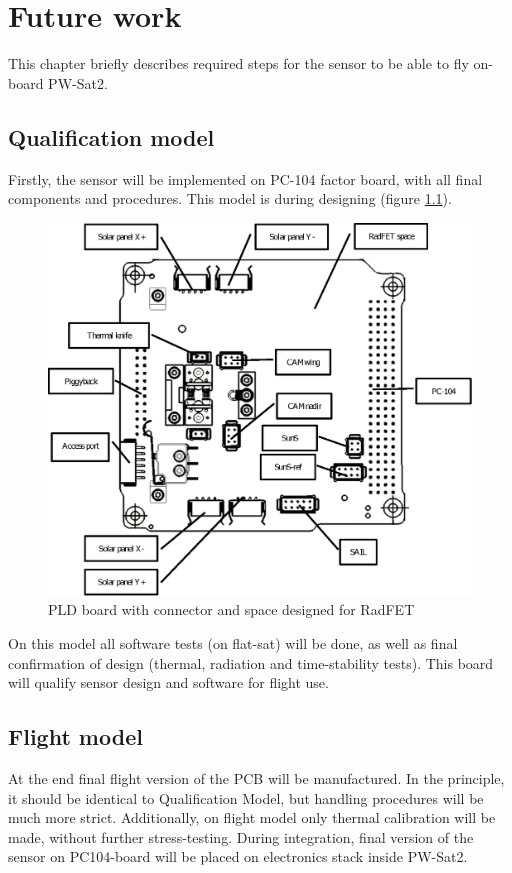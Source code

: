 \chapter{Future work}

This chapter briefly describes required steps for the sensor to be able to fly on-board PW-Sat2.

\section{Qualification model}
    Firstly, the sensor will be implemented on PC-104 factor board, with all final components and procedures. This model is during designing (figure \ref{PLD_BOARD}).

    \begin{figure}[H]
        \centering
        \includegraphics[width=0.7\paperwidth]{img/08/PC104pldBoard.eps}
        \caption{PLD board with connector and space designed for RadFET}
        \label{PLD_BOARD}
    \end{figure}


    On this model all software tests (on flat-sat) will be done, as well as final confirmation of design (thermal, radiation and time-stability tests). This board will qualify sensor design and software for flight use.

\section{Flight model}
    At the end final flight version of the PCB will be manufactured. In the principle, it should be identical to Qualification Model, but handling procedures will be much more strict. Additionally, on flight model only thermal calibration will be made, without further stress-testing. During integration, final version of the sensor on PC104-board will be placed on electronics stack inside PW-Sat2.
